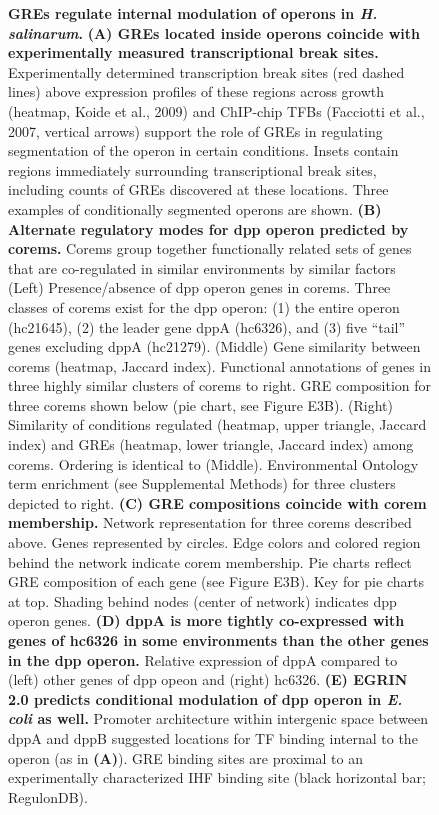 \begin{figure}[!b]
\centering
{}
\caption{{\bf GREs regulate internal modulation of operons in
    {\it H. salinarum}.}  {\bf (A) GREs located inside operons coincide with
  experimentally measured transcriptional break sites.} Experimentally
  determined transcription break sites (red dashed lines) above
  expression profiles of these regions across growth (heatmap, Koide
  et al., 2009) and ChIP-chip TFBs (Facciotti et al., 2007, vertical
  arrows) support the role of GREs in regulating segmentation of the
  operon in certain conditions. Insets contain regions immediately
  surrounding transcriptional break sites, including counts of GREs
  discovered at these locations. Three examples of conditionally
  segmented operons are shown. {\bf (B) Alternate regulatory modes for dpp
  operon predicted by corems.} Corems group together functionally
  related sets of genes that are co-regulated in similar environments
  by similar factors (Left) Presence/absence of dpp operon genes in
  corems. Three classes of corems exist for the dpp operon: (1) the
  entire operon (\eg hc21645), (2) the leader gene dppA
  (\eg hc6326), and (3) five ``tail'' genes excluding dppA
  (hc21279). (Middle) Gene similarity between corems (heatmap, Jaccard
  index). Functional annotations of genes in three highly similar
  clusters of corems to right. GRE composition for three corems shown
  below (pie chart, see Figure E3B). (Right) Similarity of conditions
  regulated (heatmap, upper triangle, Jaccard index) and GREs
  (heatmap, lower triangle, Jaccard index) among corems. Ordering is
  identical to (Middle). Environmental Ontology term enrichment (see
  Supplemental Methods) for three clusters depicted to right. {\bf (C) GRE
  compositions coincide with corem membership.} Network representation
  for three corems described above. Genes represented by circles. Edge
  colors and colored region behind the network indicate corem
  membership. Pie charts reflect GRE composition of each gene (see
  Figure E3B). Key for pie charts at top. Shading behind nodes (center
  of network) indicates dpp operon genes. {\bf (D) dppA is more tightly
  co-expressed with genes of hc6326 in some environments than the
  other genes in the dpp operon.} Relative expression of dppA compared
  to (left) other genes of dpp opeon and (right) hc6326. {\bf (E) EGRIN
  2.0 predicts conditional modulation of dpp operon in {\it E. coli} as
  well.} Promoter architecture within intergenic space between dppA and
  dppB suggested locations for TF binding internal to the operon (as
  in {\bf (A)}). GRE binding sites are proximal to an experimentally
  characterized IHF binding site (black horizontal bar; RegulonDB).  }
\label{fig:gresVsOperons}
\vspace{-.1in}
\end{figure}

